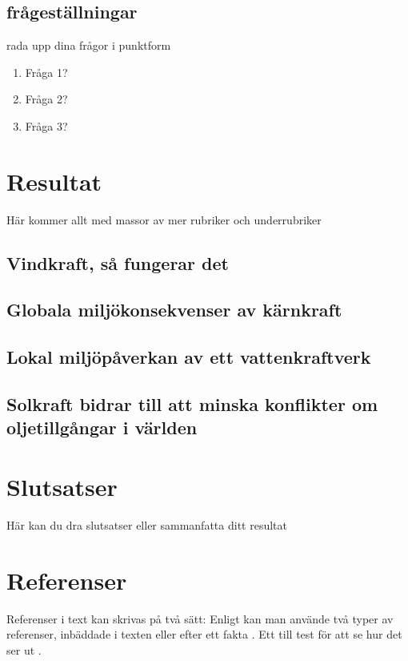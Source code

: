 \documentclass[11p]{article}
\begin{document}
    \subsection{frågeställningar}
    rada upp dina frågor i punktform
    \begin{enumerate}
        \item Fråga 1?
        \item Fråga 2?
        \item Fråga 3?
    \end{enumerate}

    \section{Resultat}
    Här kommer allt med massor av mer rubriker och underrubriker
    \subsection{Vindkraft, så fungerar det}
    \subsection{Globala miljökonsekvenser av kärnkraft}
    \subsection{Lokal miljöpåverkan av ett vattenkraftverk}
    \subsection{Solkraft bidrar till att minska konflikter om oljetillgångar i världen}
    \subsection{}

    \section{Slutsatser}
    Här kan du dra slutsatser eller sammanfatta ditt resultat


    \section{Referenser}
    Referenser i text kan skrivas på två sätt: Enligt \textcite{Jens} kan man använde två typer av referenser, inbäddade i texten eller efter ett fakta \parencite{Fraenkel}. Ett till test för att se hur det ser ut \parencite[sid 55]{fermi}.
\end{document}

